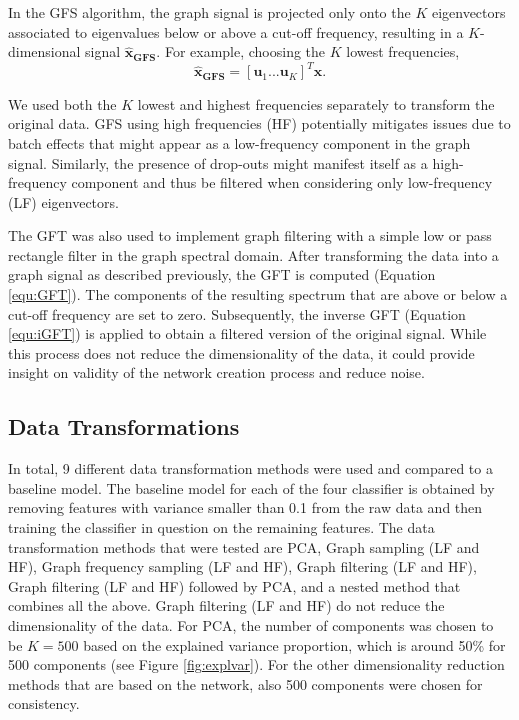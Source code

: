 \documentclass[10pt,conference,compsocconf]{IEEEtran}
\begin{document}
In the GFS algorithm, the graph signal is projected only onto the $K$ eigenvectors associated to eigenvalues below or above a cut-off frequency, resulting in a $K$-dimensional signal $\boldsymbol{\hat{x}_{GFS}}$. For example, choosing the $K$ lowest frequencies,
\begin{equation}
\boldsymbol{\hat{x}_{GFS}} = [ \boldsymbol{u}_1 ... \boldsymbol{u}_K]^T \boldsymbol{x}.
\end{equation} 
\par
We used both the $K$ lowest and highest frequencies separately to transform the original data. GFS using high frequencies (HF) potentially mitigates issues due to batch effects that might appear as a low-frequency component in the graph signal. Similarly, the presence of drop-outs might manifest itself as a high-frequency component and thus be filtered when considering only low-frequency (LF) eigenvectors.
\par
The GFT was also used to implement graph filtering with a simple low or pass rectangle filter in the graph spectral domain. After transforming the data into a graph signal as described previously, the GFT is computed (Equation \ref{equ:GFT}). The components of the resulting spectrum that are above or below a cut-off frequency are set to zero. Subsequently, the inverse GFT (Equation \ref{equ:iGFT}) is applied to obtain a filtered version of the original signal. While this process does not reduce the dimensionality of the data, it could provide insight on validity of the network creation process and reduce noise.

\subsection{Data Transformations}
In total, 9 different data transformation methods were used and compared to a baseline model. The baseline model for each of the four classifier is obtained by removing features with variance smaller than 0.1 from the raw data and then training the classifier in question on the remaining features. The data transformation methods that were tested are PCA, Graph sampling (LF and HF), Graph frequency sampling (LF and HF), Graph filtering (LF and HF), Graph filtering (LF and HF) followed by PCA, and a nested method that combines all the above. Graph filtering (LF and HF) do not reduce the dimensionality of the data. For PCA, the number of components was chosen to be $K = 500$ based on the explained variance proportion, which is around 50\% for 500 components (see Figure \ref{fig:explvar}). For the other dimensionality reduction methods that are based on the network, also 500 components were chosen for consistency.
\end{document}
